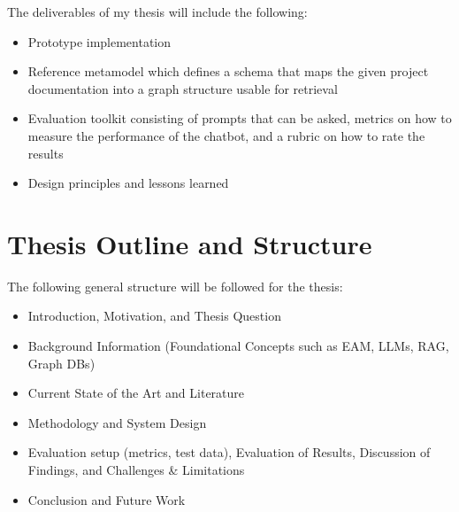 \documentclass[english]{lni}
\begin{document}
The deliverables of my thesis will include the following:
\begin{itemize}
	\item Prototype implementation
	\item Reference metamodel which defines a schema that maps the given project documentation into a graph structure usable for retrieval
	\item Evaluation toolkit consisting of prompts that can be asked, metrics on how to measure the performance of the chatbot, and a rubric on how to rate the results
	\item Design principles and lessons learned
\end{itemize}

\section{Thesis Outline and Structure}
The following general structure will be followed for the thesis:

\begin{itemize}
    \item Introduction, Motivation, and Thesis Question
    \item Background Information (Foundational Concepts such as EAM, LLMs, RAG, Graph DBs)
    \item Current State of the Art and Literature
    \item Methodology and System Design
    \item Evaluation setup (metrics, test data), Evaluation of Results, Discussion of Findings, and Challenges \& Limitations
    \item Conclusion and Future Work
\end{itemize}




\printbibliography
\end{document}
